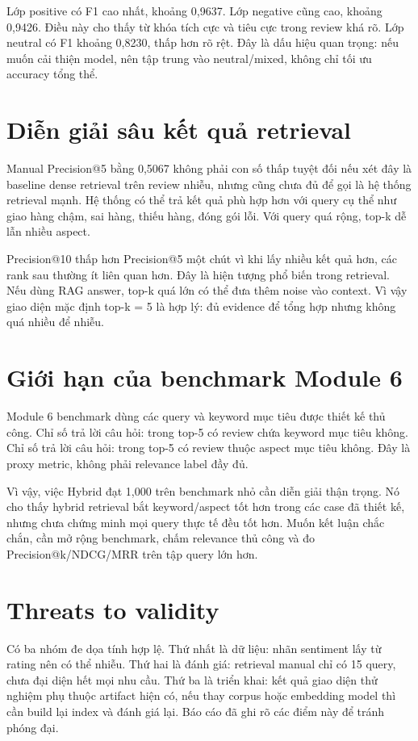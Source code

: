 Lớp positive có F1 cao nhất, khoảng 0,9637. Lớp negative cũng cao, khoảng 0,9426. Điều này cho thấy từ khóa tích cực và tiêu cực trong review khá rõ. Lớp neutral có F1 khoảng 0,8230, thấp hơn rõ rệt. Đây là dấu hiệu quan trọng: nếu muốn cải thiện model, nên tập trung vào neutral/mixed, không chỉ tối ưu accuracy tổng thể.

\section{Diễn giải sâu kết quả retrieval}
Manual Precision@5 bằng 0,5067 không phải con số thấp tuyệt đối nếu xét đây là baseline dense retrieval trên review nhiễu, nhưng cũng chưa đủ để gọi là hệ thống retrieval mạnh. Hệ thống có thể trả kết quả phù hợp hơn với query cụ thể như giao hàng chậm, sai hàng, thiếu hàng, đóng gói lỗi. Với query quá rộng, top-k dễ lẫn nhiều aspect.

Precision@10 thấp hơn Precision@5 một chút vì khi lấy nhiều kết quả hơn, các rank sau thường ít liên quan hơn. Đây là hiện tượng phổ biến trong retrieval. Nếu dùng RAG answer, top-k quá lớn có thể đưa thêm noise vào context. Vì vậy giao diện mặc định top-k = 5 là hợp lý: đủ evidence để tổng hợp nhưng không quá nhiều để nhiễu.

\section{Giới hạn của benchmark Module 6}
Module 6 benchmark dùng các query và keyword mục tiêu được thiết kế thủ công. Chỉ số  trả lời câu hỏi: trong top-5 có review chứa keyword mục tiêu không. Chỉ số  trả lời câu hỏi: trong top-5 có review thuộc aspect mục tiêu không. Đây là proxy metric, không phải relevance label đầy đủ.

Vì vậy, việc Hybrid đạt 1,000 trên benchmark nhỏ cần diễn giải thận trọng. Nó cho thấy hybrid retrieval bắt keyword/aspect tốt hơn trong các case đã thiết kế, nhưng chưa chứng minh mọi query thực tế đều tốt hơn. Muốn kết luận chắc chắn, cần mở rộng benchmark, chấm relevance thủ công và đo Precision@k/NDCG/MRR trên tập query lớn hơn.

\section{Threats to validity}
Có ba nhóm đe dọa tính hợp lệ. Thứ nhất là dữ liệu: nhãn sentiment lấy từ rating nên có thể nhiễu. Thứ hai là đánh giá: retrieval manual chỉ có 15 query, chưa đại diện hết mọi nhu cầu. Thứ ba là triển khai: kết quả giao diện thử nghiệm phụ thuộc artifact hiện có, nếu thay corpus hoặc embedding model thì cần build lại index và đánh giá lại. Báo cáo đã ghi rõ các điểm này để tránh phóng đại.

